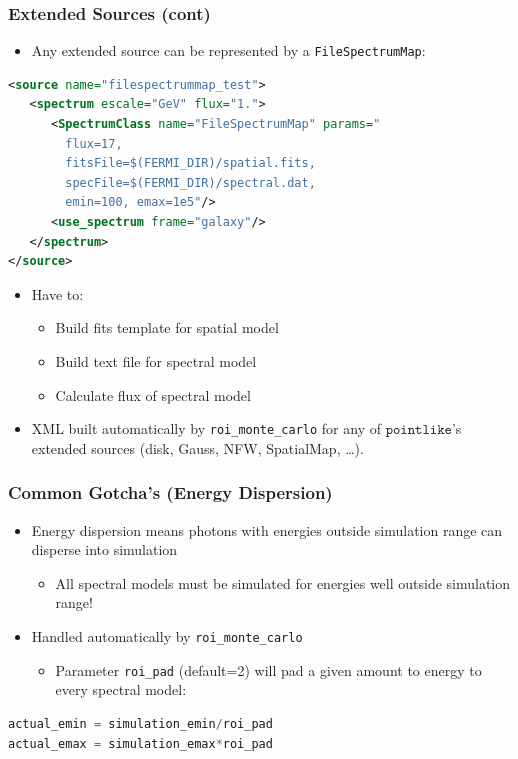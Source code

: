 \documentclass[12pt]{beamer}
\newcommand{\pointlike}{\ensuremath{\mathtt{pointlike}}\xspace}
\newcommand{\roimc}{\texttt{roi\_monte\_carlo}\xspace}
\newcommand{\FileSpectrumMap}{\texttt{FileSpectrumMap}\xspace}
\begin{document}
\begin{frame}[fragile]
\frametitle{Extended Sources (cont)}

  \begin{itemize}
    \item Any extended source can be represented by a \FileSpectrumMap:
  \end{itemize}
\begin{lstlisting}[language=XML]
<source name="filespectrummap_test">
   <spectrum escale="GeV" flux="1.">
      <SpectrumClass name="FileSpectrumMap" params="
        flux=17,
        fitsFile=$(FERMI_DIR)/spatial.fits,
        specFile=$(FERMI_DIR)/spectral.dat,
        emin=100, emax=1e5"/>
      <use_spectrum frame="galaxy"/>
   </spectrum>
</source>
\end{lstlisting}
  \begin{itemize}
    \item Have to:
      \begin{itemize}
        \item Build fits template for spatial model
        \item Build text file for spectral model
        \item Calculate flux of spectral model
      \end{itemize}
    \item XML built automatically by \roimc for any of \pointlike's extended
      sources (disk, Gauss, NFW, SpatialMap, \dots).
  \end{itemize}
\end{frame}


\begin{frame}[fragile]
  \frametitle{Common Gotcha's (Energy Dispersion)}
  \begin{itemize}
        \item Energy dispersion means photons with energies outside simulation range can
          disperse into simulation
          \begin{itemize}
            \item All spectral models must be simulated for energies well outside simulation range!
          \end{itemize}
        \item Handled automatically by \roimc
          \begin{itemize}
            \item Parameter \texttt{roi\_pad} (default=2) will pad a given
              amount to energy to every spectral model:
          \end{itemize}
      \end{itemize}
\begin{lstlisting}[language=Python]
actual_emin = simulation_emin/roi_pad
actual_emax = simulation_emax*roi_pad
\end{lstlisting}
\end{frame}
\end{document}
